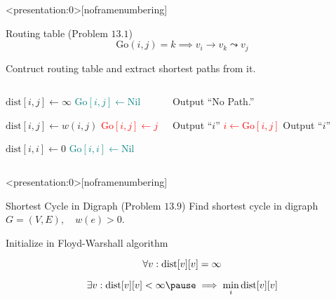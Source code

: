 \begin{frame}<presentation:0>[noframenumbering]
  \begin{exampleblock}{Routing table (Problem $13.1$)}
    \[
      \text{Go}(i,j) = k \implies v_i \to v_k \leadsto v_j
    \]

    Contruct routing table and extract shortest paths from it.
  \end{exampleblock}

  \begin{columns}
      \begin{algorithmic}
	    \State $\text{dist}[i,j] \gets \infty$
	    \State \textcolor{teal}{$\text{Go}[i,j] \gets \text{Nil}$}
	  \EndFor
	\EndFor

	\hStatex
	  \State $\text{dist}[i,j] \gets w(i,j)$
	  \State \textcolor{red}{$\text{Go}[i,j] \gets j$}
	\EndFor

	\hStatex
	  \State $\text{dist}[i,i] \gets 0$
	  \State \textcolor{teal}{$\text{Go}[i,i] \gets \text{Nil}$}
	\EndFor
      \end{algorithmic}
      \pause
      \begin{algorithmic}
	  \State Output ``No Path.''
	  \EndIf

	  \Statex
	  \State Output ``$i$''
	    \textcolor{red}{\State $i \gets \text{Go}[i,j]$}
	    \State Output ``$i$''
	  \EndWhile
	\EndProcedure
      \end{algorithmic}
  \end{columns}
\end{frame}

\begin{frame}<presentation:0>[noframenumbering]
  \begin{exampleblock}{Shortest Cycle in Digraph (Problem $13.9$)}
    Find shortest cycle in digraph $G = (V, E), \quad w(e) > 0$.
  \end{exampleblock}

  \pause
  \vspace{0.50cm}
  \centerline{Initialize \red{$\dist[v][v] \gets \infty$} in Floyd-Warshall algorithm} 

  \pause
  \[
    \forall v: \text{dist}[v][v] = \infty
  \]

  \pause
  \[
    \exists v: \dist[v][v] < \infty \pause \implies \min_{i} \dist[v][v]
  \]
\end{frame}
